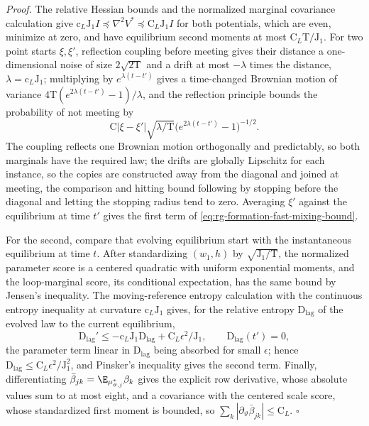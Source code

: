 \noindent\emph{Proof.}
The relative Hessian bounds and the normalized marginal covariance calculation
give \(\mathrm c_L\mathrm J_1I\preceq\nabla^2V^*\preceq\mathrm C_L\mathrm J_1I\)
for both potentials, which are even, minimize at zero, and have equilibrium
second moments at most \(\mathrm C_L\mathrm T/\mathrm J_1\). For two point
starts \(\xi,\xi'\), reflection coupling before meeting gives their distance a
one-dimensional noise of size \(2\sqrt{2\mathrm T}\) and a drift at most
\(-\lambda\) times the distance, \(\lambda=\mathrm c_L\mathrm J_1\); multiplying
by \(e^{\lambda(t-t')}\) gives a time-changed Brownian motion of variance
\(4\mathrm T(e^{2\lambda(t-t')}-1)/\lambda\), and the reflection principle
bounds the probability of not meeting by
\begin{equation}
 \mathrm C|\xi-\xi'|\sqrt{\lambda/\mathrm T}
                 \bigl(e^{2\lambda(t-t')}-1\bigr)^{-1/2}.
 \label{eq:rg-formation-reflection-bound}
\end{equation}
The coupling reflects one Brownian motion orthogonally and predictably, so
both marginals have the required law; the drifts are globally Lipschitz for
each instance, so the copies are constructed away from the diagonal and joined
at meeting, the comparison and hitting bound following by stopping before the
diagonal and letting the stopping radius tend to zero. Averaging \(\xi'\)
against the equilibrium at time \(t'\) gives the first term of
\cref{eq:rg-formation-fast-mixing-bound}.

For the second, compare that evolving equilibrium start with the
instantaneous equilibrium at time \(t\). After standardizing \((w_1,h)\) by
\(\sqrt{\mathrm J_1/\mathrm T}\), the normalized parameter score is a centered
quadratic with uniform exponential moments, and the loop-marginal score, its
conditional expectation, has the same bound by Jensen's inequality. The
moving-reference entropy calculation with the continuous entropy inequality at
curvature \(\mathrm c_L\mathrm J_1\) gives, for the relative entropy
\(\mathrm D_{\mathrm{lag}}\) of the evolved law to the current equilibrium,
\begin{equation}
 \mathrm D_{\mathrm{lag}}'\le-\mathrm c_L\mathrm J_1\mathrm D_{\mathrm{lag}}
 +\mathrm C_L\epsilon^2/\mathrm J_1,\qquad \mathrm D_{\mathrm{lag}}(t')=0,
 \label{eq:rg-formation-fast-equilibrium-lag}
\end{equation}
the parameter term linear in \(\mathrm D_{\mathrm{lag}}\) being absorbed for
small \(\epsilon\); hence \(\mathrm D_{\mathrm{lag}}\le\mathrm C_L\epsilon^2/\mathrm J_1^2\),
and Pinsker's inequality gives the second term. Finally, differentiating
\(\bar\beta_{jk}=\E_{\mu_{\vartheta,j}^*}\beta_k\) gives the explicit row
derivative, whose absolute values sum to at most eight, and a covariance with
the centered scale score, whose standardized first moment is bounded, so
\(\sum_k|\partial_\vartheta\bar\beta_{jk}|\le\mathrm C_L\). \hfill\(\square\)

